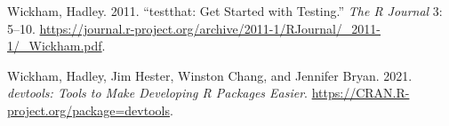 \begin{CSLReferences}{1}{0}
\leavevmode{}%
Wickham, Hadley. 2011. {``{testthat: Get Started with Testing}.''} \emph{The R Journal} 3: 5--10. \url{https://journal.r-project.org/archive/2011-1/RJournal/_2011-1/_Wickham.pdf}.

\leavevmode{}%
Wickham, Hadley, Jim Hester, Winston Chang, and Jennifer Bryan. 2021. \emph{{devtools: Tools to Make Developing R Packages Easier}}. \url{https://CRAN.R-project.org/package=devtools}.

\end{CSLReferences}



\address{%
John C. Nash\\
retired professor, University of Ottawa\\%
Telfer School of Management\\ Ottawa ON Canada K1N 6N5\\
%
%
\textit{ORCiD: \href{https://orcid.org/0000-0002-2762-8039}{0000-0002-2762-8039}}\\%
\href{mailto:profjcnash@gmail.com}{\nolinkurl{profjcnash@gmail.com}}%
}

\address{%
Arkajyoti Bhattacharjee\\
Indian Institute of Technology\\%
Department of Mathematics and Statistics\\ Kanpur\\
%
%
%
\href{mailto:arkastat98@gmail.com}{\nolinkurl{arkastat98@gmail.com}}%
}
